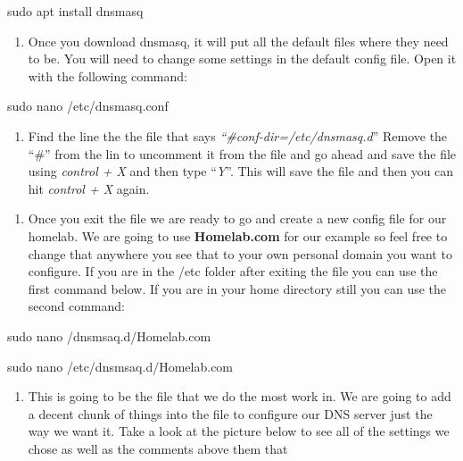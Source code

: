 \documentclass{article} %
\begin{document}
\noindent 

sudo apt install dnsmasq

\noindent 

\noindent 

\begin{enumerate}
\item  Once you download dnsmasq, it will put all the default files where they need to be. You will need to change some settings in the default config file. Open it with the following command:
\end{enumerate}

\noindent 

sudo nano /etc/dnsmasq.conf

\noindent 

\noindent 

\begin{enumerate}
\item  Find the line the the file that says \textit{``\#conf-dir=/etc/dnsmasq.d}'' Remove the ``\#'' from the lin to uncomment it from the file and go ahead and save the file using \textit{control + X} and then type ``\textit{Y}''. This will save the file and then you can hit \textit{control + X} again. 
\end{enumerate}

\noindent 

\begin{enumerate}
\item  Once you exit the file we are ready to go and create a new config file for our homelab. We are going to use \textbf{Homelab.com} for our example so feel free to change that anywhere you see that to your own personal domain you want to configure. If you are in the /etc folder after exiting the file you can use the first command below. If you are in your home directory still you can use the second command: 
\end{enumerate}

\noindent 

\noindent sudo nano /dnsmsaq.d/Homelab.com

\noindent 

\noindent sudo nano /etc/dnsmsaq.d/Homelab.com

\noindent 

\noindent 

\begin{enumerate}
\item  This is going to be the file that we do the most work in. We are going to add a decent chunk of things into the file to configure our DNS server just the way we want it. Take a look at the picture below to see all of the settings we chose as well as the comments above them that 
\end{enumerate}
\end{document}

